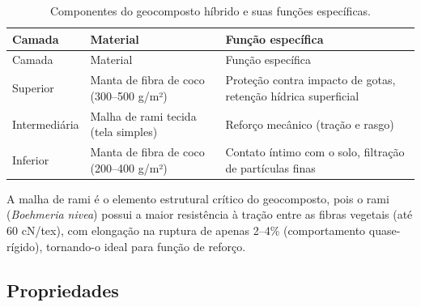 \documentclass[
  portuguese,
  11pt,
  a4paper,
  open=any]{scrbook}
\begin{document}
\begin{longtable}[]{@{}
  >{\raggedright\arraybackslash}p{}
  >{\raggedright\arraybackslash}p{}
  >{\raggedright\arraybackslash}p{}@{}}
\caption{Componentes do geocomposto híbrido e suas funções
específicas.}\label{tbl-geocomposto}\tabularnewline
\toprule\noalign{}
\begin{minipage}[b]{\linewidth}\raggedright
Camada
\end{minipage} & \begin{minipage}[b]{\linewidth}\raggedright
Material
\end{minipage} & \begin{minipage}[b]{\linewidth}\raggedright
Função específica
\end{minipage} \\
\midrule\noalign{}
\endfirsthead
\toprule\noalign{}
\begin{minipage}[b]{\linewidth}\raggedright
Camada
\end{minipage} & \begin{minipage}[b]{\linewidth}\raggedright
Material
\end{minipage} & \begin{minipage}[b]{\linewidth}\raggedright
Função específica
\end{minipage} \\
\midrule\noalign{}
\endhead
\bottomrule\noalign{}
\endlastfoot
Superior & Manta de fibra de coco (300--500 g/m²) & Proteção contra
impacto de gotas, retenção hídrica superficial \\
Intermediária & Malha de rami tecida (tela simples) & Reforço mecânico
(tração e rasgo) \\
Inferior & Manta de fibra de coco (200--400 g/m²) & Contato íntimo com o
solo, filtração de partículas finas \\
\end{longtable}

A malha de rami é o elemento estrutural crítico do geocomposto, pois o
rami (\emph{Boehmeria nivea}) possui a maior resistência à tração entre
as fibras vegetais (até 60 cN/tex), com elongação na ruptura de apenas
2--4\% (comportamento quase-rígido), tornando-o ideal para função de
reforço.

\subsection{Propriedades}\label{propriedades-1}
\end{document}
